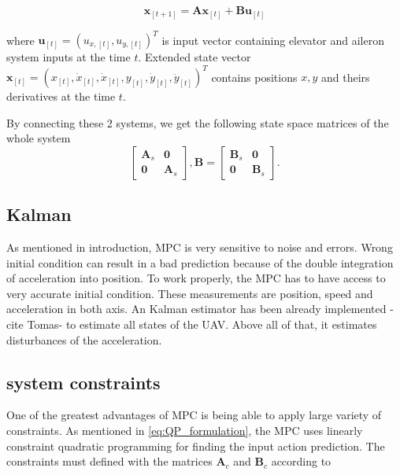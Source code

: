 \documentclass{article}
\begin{document}
\begin{equation}
\label{eq:state_space_model_simple}
\textbf{x}_{[t+1]} = \textbf{A} \textbf{x}_{[t]} +\textbf{B} \textbf{u}_{[t]}
\end{equation}

where $\textbf{u}_{[t]} = (u_{x,[t]}, u_{y,[t]})^T$ is input vector containing elevator and aileron system inputs at the time $t$. Extended state vector $\textbf{x}_{[t]} = (x_{[t]}, \dot{x}_{[t]}, \dot{x}_{[t]}, y_{[t]}, \dot{y}_{[t]}, \ddot{y}_{[t]})^T$ contains positions $x,y$ and theirs derivatives at the time $t$. 

By connecting these 2 systems, we get the following state space matrices of the whole system
\begin{equation}
\label{eq:state_space}
\begin{bmatrix}
	\textbf{A}_s & \textbf{0}	\\
	\textbf{0}   & \textbf{A}_s
\end{bmatrix}, \textbf{B} = \begin{bmatrix}
	\textbf{B}_s & \textbf{0}	\\
	\textbf{0}   & \textbf{B}_s
\end{bmatrix}.
\end{equation}



\subsection{Kalman}
As mentioned in introduction, MPC is very sensitive to noise and errors. Wrong initial condition can result in a bad prediction because of the double integration of acceleration into position. To work properly, the MPC has to have access to very accurate initial condition. These measurements are position, speed and acceleration in both axis. An Kalman estimator has been already implemented -cite Tomas- to estimate all states of the UAV. Above all of that, it estimates disturbances of the acceleration.





\subsection{system constraints}
One of the greatest advantages of MPC is being able to apply large variety of constraints. As mentioned in \ref{eq:QP_formulation}, the MPC uses linearly constraint quadratic programming for finding the input action prediction. The constraints must defined with the matrices $\textbf{A}_c$ and $\textbf{B}_c$ according to 
\end{document}
